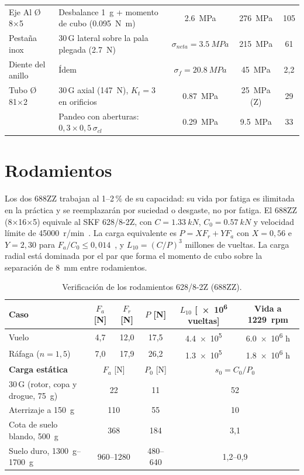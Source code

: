\begin{table}[tp]
\begin{tabularx}{\textwidth}{@{}lYccc@{}}
Eje Al Ø\,8×5 & Desbalance \SI{1}{g} + momento de cubo (\SI{0.095}{N.m}) & \SI{2.6}{MPa} & \SI{276}{MPa} & 105\\
Pestaña inox & 30\,G lateral sobre la pala plegada (\SI{2.7}{N}) & $\sigma_{neta}=\SI{3.5}{MPa}$ & \SI{215}{MPa} & 61\\
Diente del anillo & Ídem & $\sigma_f=\SI{20.8}{MPa}$ & \SI{45}{MPa} & 2,2\\
Tubo Ø\,81×2 & 30\,G axial (\SI{147}{N}), $K_t=3$ en orificios & \SI{0.87}{MPa} & \SI{25}{MPa} (Z) & 29\\
             & Pandeo con aberturas: $0{,}3\times0{,}5\,\sigma_{cl}$ & \SI{0.29}{MPa} & \SI{9.5}{MPa} & 33\\
\bottomrule
\end{tabularx}
\end{table}

\section{Rodamientos}\label{sec:estructura-rod}

Los dos 688ZZ trabajan al 1--2\,\% de su capacidad: su vida por fatiga es ilimitada en
la práctica y se reemplazarán por suciedad o desgaste, no por fatiga. El 688ZZ
(8×16×5) equivale al SKF 628/8-2Z, con $C=\SI{1.33}{kN}$, $C_0=\SI{0.57}{kN}$ y
velocidad límite de \SI{45000}{r/min}~\cite{estructura-skf}. La carga equivalente es
$P=XF_r+YF_a$ con $X=0{,}56$ e $Y=2{,}30$ para $F_a/C_0\le0{,}014$~\cite{budynas2015}, y
$L_{10}=(C/P)^3$ millones de vueltas. La carga radial está dominada por el par que forma
el momento de cubo sobre la separación de \SI{8}{mm} entre rodamientos.

\begin{table}[H]
\centering\small
\caption{Verificación de los rodamientos 628/8-2Z (688ZZ).}\label{tab:estructura-rod}
\begin{tabular}{@{}lccccc@{}}
\toprule
\textbf{Caso} & $F_a$ [N] & $F_r$ [N] & $P$ [N] & $L_{10}$ [\num{e6} vueltas] & \textbf{Vida a \SI{1229}{rpm}}\\\midrule
Vuelo                       & 4,7 & 12,0 & 17,5 & \num{4.4e5} & \num{6.0e6} h\\
Ráfaga ($n=1{,}5$)          & 7,0 & 17,9 & 26,2 & \num{1.3e5} & \num{1.8e6} h\\\midrule
\textbf{Carga estática} & \multicolumn{2}{c}{$F_a$ [N]} & $P_0$ [N] & \multicolumn{2}{c}{$s_0=C_0/P_0$}\\\midrule
30\,G (rotor, copa y drogue, \SI{75}{g}) & \multicolumn{2}{c}{22} & 11 & \multicolumn{2}{c}{52}\\
Aterrizaje a \SI{150}{g} & \multicolumn{2}{c}{110} & 55 & \multicolumn{2}{c}{10}\\
Cota de suelo blando, \SI{500}{g} & \multicolumn{2}{c}{368} & 184 & \multicolumn{2}{c}{3,1}\\
Suelo duro, \SIrange{1300}{1700}{g} & \multicolumn{2}{c}{960--1280} & 480--640 & \multicolumn{2}{c}{1,2--0,9}\\
\bottomrule
\end{tabular}
\end{table}

